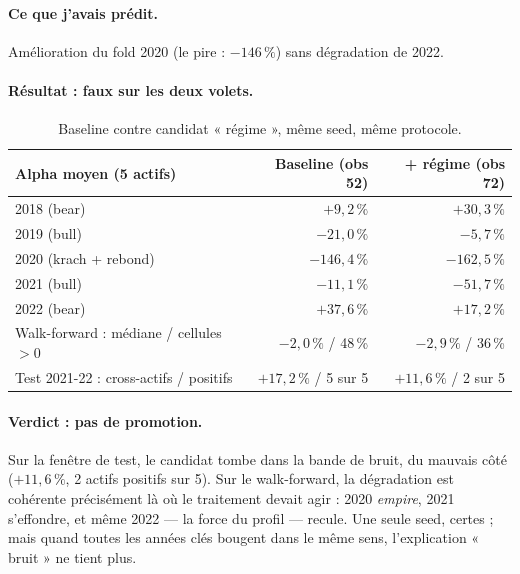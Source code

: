 \documentclass[11pt,a4paper]{article}
\newcommand{\ko}[1]{\textcolor{kored}{#1}}
\begin{document}
\paragraph{Ce que j'avais prédit.} Amélioration du fold 2020 (le pire : $-146\,\%$)
sans dégradation de 2022.

\paragraph{Résultat : faux sur les deux volets.}

\begin{table}[H]
\centering\small
\begin{tabular}{@{}lrr@{}}
\toprule
\textbf{Alpha moyen (5 actifs)} & \textbf{Baseline (obs 52)} & \textbf{+ régime (obs 72)} \\
\midrule
2018 (bear)            & $+9{,}2\,\%$   & $+30{,}3\,\%$\footnotemark \\
2019 (bull)            & $-21{,}0\,\%$  & $-5{,}7\,\%$ \\
2020 (krach + rebond)  & $-146{,}4\,\%$ & \ko{$-162{,}5\,\%$} \\
2021 (bull)            & $-11{,}1\,\%$  & \ko{$-51{,}7\,\%$} \\
2022 (bear)            & $+37{,}6\,\%$  & \ko{$+17{,}2\,\%$} \\
\midrule
Walk-forward : médiane / cellules $>0$ & $-2{,}0\,\%$ / 48\,\% & $-2{,}9\,\%$ / 36\,\% \\
Test 2021-22 : cross-actifs / positifs & $+17{,}2\,\%$ / 5 sur 5 & $+11{,}6\,\%$ / 2 sur 5 \\
\bottomrule
\end{tabular}
\caption{Baseline contre candidat « régime », même seed, même protocole.}
\label{tab:regime}
\end{table}

\paragraph{Verdict : pas de promotion.} Sur la fenêtre de test, le candidat tombe dans
la bande de bruit, du mauvais côté ($+11{,}6\,\%$, 2 actifs positifs sur 5). Sur le
walk-forward, la dégradation est cohérente précisément là où le traitement devait
agir : 2020 \emph{empire}, 2021 s'effondre, et même 2022 --- la force du profil ---
recule. Une seule seed, certes ; mais quand toutes les années clés bougent dans le même
sens, l'explication « bruit » ne tient plus.
\end{document}
